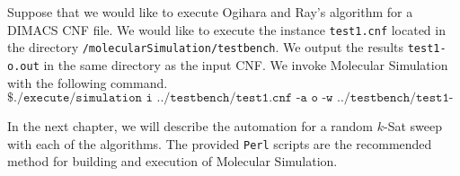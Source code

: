 Suppose that we would like to execute Ogihara and Ray's algorithm for a DIMACS CNF file.  We would like to execute the instance \texttt{test1.cnf} located in the directory \texttt{/molecularSimulation/testbench}.  We output the results \texttt{test1-o.out} in the same directory as the input CNF.  We invoke Molecular Simulation with the following command.
\[
\texttt{\$ ./execute/simulation i ../testbench/test1.cnf -a o -w ../testbench/test1-o.out}
\]
		
In the next chapter, we will describe the automation for a random $k$-{\sc Sat} sweep with each of the algorithms.  The provided \texttt{Perl} scripts are the recommended method for building and execution of Molecular Simulation.
